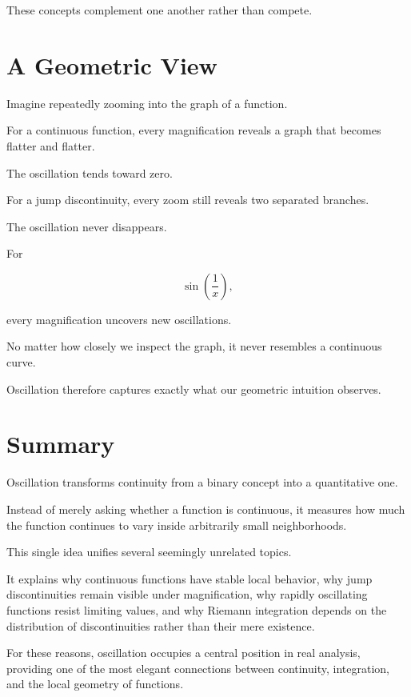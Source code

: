 \documentclass{essay}
\begin{document}
These concepts complement one another rather than compete.


\section{A Geometric View}

Imagine repeatedly zooming into the graph of a function.

For a continuous function, every magnification reveals a graph that becomes
flatter and flatter.

The oscillation tends toward zero.

For a jump discontinuity, every zoom still reveals two separated branches.

The oscillation never disappears.

For

\[ \sin\left(\frac{1}{x}\right), \]

every magnification uncovers new oscillations.

No matter how closely we inspect the graph, it never resembles a continuous
curve.

Oscillation therefore captures exactly what our geometric intuition observes.


\section{Summary}

Oscillation transforms continuity from a binary concept into a quantitative one.

Instead of merely asking whether a function is continuous, it measures how much
the function continues to vary inside arbitrarily small neighborhoods.

This single idea unifies several seemingly unrelated topics.

It explains why continuous functions have stable local behavior, why jump
discontinuities remain visible under magnification, why rapidly oscillating
functions resist limiting values, and why Riemann integration depends on the
distribution of discontinuities rather than their mere existence.

For these reasons, oscillation occupies a central position in real analysis,
providing one of the most elegant connections between continuity, integration,
and the local geometry of functions.
\end{document}
